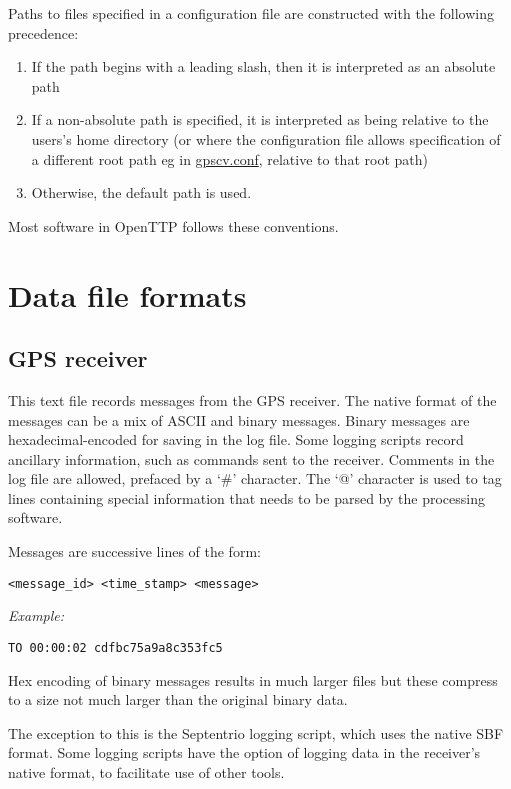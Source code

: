 Paths to files  specified in a configuration file are constructed with the following 
precedence:
\begin{enumerate}
\item If the path begins with a leading slash, then it is interpreted as an absolute path
\item If a non-absolute path is specified, it is interpreted as being relative to 
	the users's home directory (or where the configuration file allows specification of a different root path eg in \hyperlink{h:rootpath}{gpscv.conf}, relative to that root path) 
\item Otherwise, the default path is used.
\end{enumerate}
Most software in OpenTTP follows these conventions.

\section{Data file formats \label{s:DataFileFormat}}

\subsection{GPS receiver}

This text file records messages from the GPS receiver. 
The native format of the messages can be a mix of ASCII and binary messages.
Binary messages are hexadecimal-encoded for saving in the log file. 
Some logging scripts record ancillary information, such as commands sent to the receiver. 
Comments in the log file are allowed, prefaced by a `\#' character. 
The `@' character is used to tag lines containing special information that needs to be parsed by
the processing software.

Messages are successive lines of the form:
\begin{lstlisting}
<message_id> <time_stamp> <message>
\end{lstlisting}
\textit{Example:}
\begin{lstlisting}
TO 00:00:02 cdfbc75a9a8c353fc5
\end{lstlisting}

Hex encoding of binary messages results in much larger files but these compress to a size not much larger
than the original binary data.

The exception to this is the Septentrio logging script, which uses the native SBF format.
Some logging scripts have the option of logging data in the receiver's native format, to facilitate
use of other tools.

